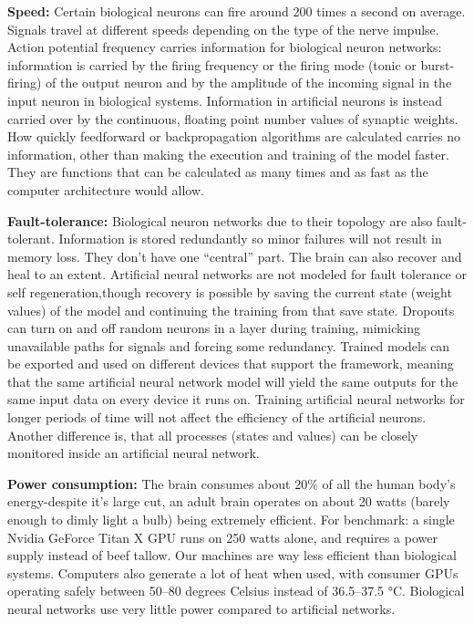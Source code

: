 \textbf{Speed:} Certain biological neurons can fire around 200 times a second on average. Signals travel at different speeds depending on the type of the nerve impulse. Action potential frequency carries information for biological neuron networks: information is carried by the firing frequency or the firing mode (tonic or burst-firing) of the output neuron and by the amplitude of the incoming signal in the input neuron in biological systems. Information in artificial neurons is instead carried over by the continuous, floating point number values of synaptic weights. How quickly feedforward or backpropagation algorithms are calculated carries no information, other than making the execution and training of the model faster. They are functions that can be calculated as many times and as fast as the computer architecture would allow. 

\textbf{Fault-tolerance:} Biological neuron networks due to their topology are also fault-tolerant. Information is stored redundantly so minor failures will not result in memory loss. They don’t have one “central” part. The brain can also recover and heal to an extent. Artificial neural networks are not modeled for fault tolerance or self regeneration,though recovery is possible by saving the current state (weight values) of the model and continuing the training from that save state. Dropouts can turn on and off random neurons in a layer during training, mimicking unavailable paths for signals and forcing some redundancy. Trained models can be exported and used on different devices that support the framework, meaning that the same artificial neural network model will yield the same outputs for the same input data on every device it runs on. Training artificial neural networks for longer periods of time will not affect the efficiency of the artificial neurons.  Another difference is, that all processes (states and values) can be closely monitored inside an artificial neural network.

\textbf{Power consumption:} The brain consumes about 20\% of all the human body’s energy-despite it’s large cut, an adult brain operates on about 20 watts (barely enough to dimly light a bulb) being extremely efficient. For benchmark: a single Nvidia GeForce Titan X GPU runs on 250 watts alone, and requires a power supply instead of beef tallow. Our machines are way less efficient than biological systems. Computers also generate a lot of heat when used, with consumer GPUs operating safely between 50–80 degrees Celsius instead of 36.5–37.5 °C.
 Biological neural networks use very little power compared to artificial networks.


